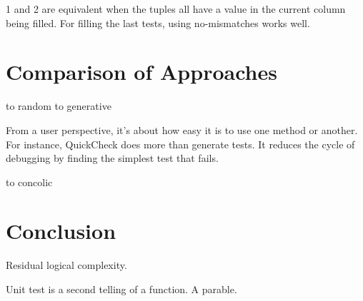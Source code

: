 \documentclass{juliacon}
\begin{document}
1 and 2 are equivalent when the tuples all have a value in the current column being filled.
For filling the last tests, using no-mismatches works well.

\section{Comparison of Approaches}
to random
to generative

From a user perspective, it's about how easy it is to use one method or another. For instance, QuickCheck does more than generate tests. It reduces the cycle of debugging by finding the simplest test that fails.

to concolic


\section{Conclusion}
Residual logical complexity.

Unit test is a second telling of a function. A parable.


\end{document}
